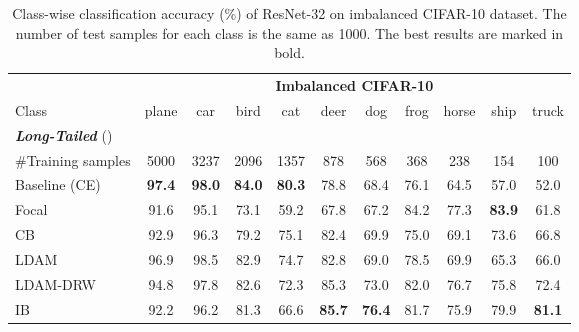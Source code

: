 \begin{table*}[t]
\caption{
Class-wise classification accuracy (\%) of ResNet-32 on imbalanced CIFAR-10 dataset.
The number of test samples for each class is the same as 1000.
The best results are marked in bold. 
}
\vspace{0.2cm}
\label{result-class-wise}
\centering
\small
{
\begin{tabular}{
l
ccccc
ccccc
} 
    \toprule
    &  \multicolumn{10}{c}{\textbf{Imbalanced CIFAR-10}}
    \\
    \cmidrule(){2-11}
Class 
    & plane & car & bird & cat & deer 
    & dog & frog & horse & ship & truck 
    \\
    \midrule\midrule
    
    \textit{\textbf{Long-Tailed}} ()
    &  &  &  &  & 
    &  &  &  &  & 
    \\
    \#Training samples
    & 5000 & 3237 & 2096 & 1357 & 878 
    & 568 & 368 & 238 & 154 & 100 
    \\
    \midrule
    Baseline (CE)
& \textbf{97.4}
        & \textbf{98.0}
        & \textbf{84.0}
        & \textbf{80.3}
        & 78.8
        & 68.4
        & 76.1
        & 64.5
        & 57.0
        & 52.0
        \\
        
     Focal \cite{ref:lin_focal_loss_iccv17}
& 91.6
        & 95.1
        & 73.1
        & 59.2
        & 67.8
        & 67.2
        & 84.2
        & 77.3
        & \textbf{83.9}
        & 61.8
        \\
    
    CB ~\cite{ref:cui_belongie_cvpr19}
& 92.9
        & 96.3
        & 79.2
        & 75.1
        & 82.4
        & 69.9
        & 75.0
        & 69.1
        & 73.6
        & 66.8
        \\
        
    LDAM~\cite{ref:cao_ldam_neurips2019}
& 96.9
        & 98.5
        & 82.9
        & 74.7
        & 82.8
        & 69.0
        & 78.5
        & 69.9
        & 65.3
        & 66.0
        \\
        
    LDAM-DRW~\cite{ref:cao_ldam_neurips2019}
& 94.8
        & 97.8
        & 82.6
        & 72.3
        & 85.3
        & 73.0
        & 82.0
        & 76.7
        & 75.8
        & 72.4
        \\
    
    \midrule
    
    IB 
& 92.2
        & 96.2
        & 81.3
        & 66.6
        & \textbf{85.7}
        & \textbf{76.4}
        & 81.7
        & 75.9
        & 79.9
        & \textbf{81.1}
        \\
        

\end{tabular}}
\end{table*}
